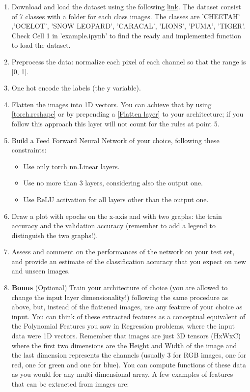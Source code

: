 \documentclass[11pt]{scrartcl}
\begin{document}
\begin{enumerate}
\item Download and load the dataset using the following 
\href{https://drive.switch.ch/index.php/s/XSnhQDNar7y46oQ}{link}.  
The dataset consist of 7 classes with a folder for each class images. 
The classes are 'CHEETAH' ,'OCELOT', 'SNOW LEOPARD', 'CARACAL', 'LIONS', 'PUMA', 'TIGER'. 
Check Cell 1 in 'example.ipynb' to find the ready and implemented function to load the dataset. 

\item Preprocess the data: normalize each pixel of each channel so that the range is [0, 1].

\item One hot encode the labels (the y variable).

\item Flatten the images into 1D vectors. 
You can achieve that by using 
\href{https://pytorch.org/docs/stable/generated/torch.reshape.html}{[torch.reshape]} 
or by prepending a 
\href{https://pytorch.org/docs/stable/generated/torch.nn.Flatten.html}{[Flatten layer]} 
to your architecture; 
if you follow this approach this layer will not count for the rules at point 5.

\item Build a Feed Forward Neural Network of your choice, following these constraints:
\begin{itemize}
	\item Use only torch nn.Linear layers.
	\item Use no more than 3 layers, considering also the output one.
	\item Use ReLU activation for all layers other than the output one.
\end{itemize}

\item Draw a plot with epochs on the x-axis and with two graphs: 
the train accuracy and the validation accuracy 
(remember to add a legend to distinguish the two graphs!).

\item Assess and comment on the performances of the network on your test set, 
and provide an estimate of the classification accuracy that you expect on new and unseen images. 
\item \textbf{Bonus} (Optional) 
Train your architecture of choice 
(you are allowed to change the input layer dimensionality!) 
following the same procedure as above, but, instead of the flattened images, 
use any feature of your choice as input. 
You can think of these extracted features as a conceptual equivalent of the Polynomial Features 
you saw in Regression problems, where the input data were 1D vectors. 
Remember that images are just 3D tensors (HxWxC) 
where the first two dimensions are the Height and Width of the image 
and the last dimension represents the channels 
(usually 3 for RGB images, one for red, one for green and one for blue). 
You can compute functions of these data as you would for any multi-dimensional array. 
A few examples of features that can be extracted from images are:


\end{enumerate}
\end{document}
